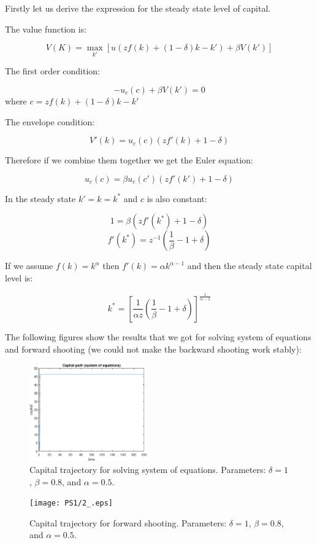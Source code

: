 \documentclass[12pt]{article}
\newcommand{\?}{\stackrel{?}{=}}
\begin{document}
Firstly let us derive the expression for the steady state level of capital.

The value function is:

\[
V(K) = \max_{k'} [ u(zf(k) + (1-\delta)k - k') + \beta V(k')]
\]

The first order condition:

\[
-u_c (c) + \beta V(k') = 0
\]
where $c = zf(k) + (1-\delta)k - k'$

The envelope condition:

\[
V'(k) = u_c (c) (zf'(k) + 1-\delta)
\]

Therefore if we combine them together we get the Euler equation:

\[
u_c (c) = \beta u_c (c') (zf'(k') + 1-\delta) 
\]

In the steady state $k'=k=k^*$ and $c$ is also constant:

\[
1 = \beta (zf'(k^*) + 1 - \delta)
\]
\[
f'(k^*) = z^{-1} \left( \frac{1}{\beta} - 1 + \delta \right)
\]

If we assume $f(k) = k^\alpha$ then $f'(k) = \alpha k^{\alpha-1}$ and then the steady state capital level is:

\[
k^* = \left[ \frac{1}{\alpha z} \left( \frac{1}{\beta} - 1 + \delta \right) \right]^{\frac{1}{\alpha-1}}
\]

The following figures show the results that we got for solving system of equations and forward shooting (we could not make the backward shooting work stably):

\begin{figure}[htbp!]
    \centering
    \includegraphics[width=0.45\textwidth]{PS1/2_sys.eps}
    \caption{Capital trajectory for solving system of equations. Parameters: $\delta=1$, $\beta=0.8$, and $\alpha=0.5$.}
\end{figure}

\begin{figure}[htbp!]
    \centering
    \texttt{[image: PS1/2\_.eps]}
    \caption{Capital trajectory for forward shooting. Parameters: $\delta=1$, $\beta=0.8$, and $\alpha=0.5$.}
\end{figure}
\end{document}
